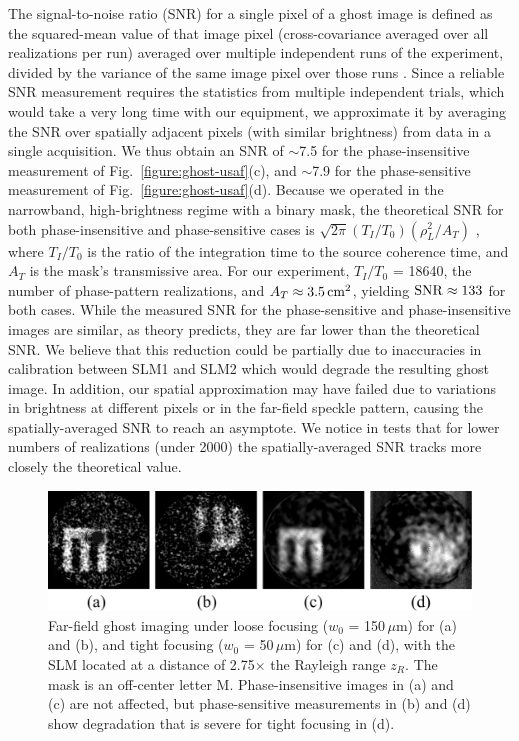 The signal-to-noise ratio (SNR) for a single pixel of a ghost image is defined as the squared-mean value of that image pixel (cross-covariance averaged over all realizations per run) averaged over multiple independent runs of the experiment, divided by the variance of the same image pixel over those runs \cite{erkmen-unified}. Since a reliable SNR measurement requires the statistics from multiple independent trials, which would take a very long time with our equipment, we approximate it by averaging the SNR over spatially adjacent pixels (with similar brightness) from data in a single acquisition. We thus obtain an SNR of $\sim$7.5 for the phase-insensitive measurement of Fig.~\ref{figure:ghost-usaf}(c), and $\sim$7.9 for the phase-sensitive measurement of Fig.~\ref{figure:ghost-usaf}(d).  Because we operated in the narrowband, 
high-brightness regime with a binary mask, the theoretical SNR for both phase-insensitive and phase-sensitive cases is $\sqrt{2\pi}(T_I/T_0)(\rho_L^2/A_T)$ \cite{erkmen-unified}, where $T_I/T_0$ is the ratio of the integration time to the source coherence time, and $A_T$ is the mask's transmissive area.  For our experiment, $T_I/T_0$ = 18640, the number of phase-pattern realizations, and $A_T \approx 3.5\,{\rm cm}^2$, yielding  ${\rm SNR}\approx 133$ for both cases. While the measured SNR for the phase-sensitive and phase-insensitive images are similar, as theory predicts, they are far lower than the theoretical SNR. We believe that this reduction could be partially due to inaccuracies in calibration between SLM1 and SLM2 which would degrade the resulting ghost image. In addition, our spatial approximation may have failed due to variations in brightness at different pixels or in the 
far-field speckle pattern, causing the spatially-averaged SNR to reach an asymptote. We notice in tests that for lower numbers of realizations (under 2000) the spatially-averaged SNR tracks more closely the theoretical value.

\begin{figure}[htb]
\centerline{\includegraphics[width=14cm]{figure-ghost-blur.pdf}}
\caption{Far-field ghost imaging under loose focusing ($w_0$ = 150\,$\mu$m) for (a) and (b), and tight focusing ($w_0$ = 50\,$\mu$m) for (c) and (d), with the SLM located at a distance of 2.75$\times$ the Rayleigh range $z_R$. The mask is an off-center letter M.  
Phase-insensitive images in (a) and (c) are not affected, but 
phase-sensitive measurements in (b) and (d) show degradation that is severe for tight focusing in (d).}
\label{figure:ghost-blur}
\end{figure}

